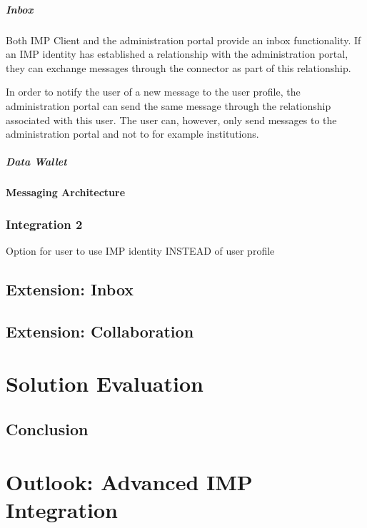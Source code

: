 \documentclass[
     12pt,         %
     a4paper,      %
     BCOR=10mm,version=first,     %
     DIV=14,version=first,        %
     ]{scrreprt}
\begin{document}
\paragraph{Inbox}

Both IMP Client and the administration portal provide an inbox functionality. If an IMP identity has established a relationship with the administration portal, they can exchange messages through the connector as part of this relationship.

In order to notify the user of a new message to the user profile, the administration portal can send the same message through the relationship associated with this user.
The user can, however, only send messages to the administration portal and not to for example institutions.

\paragraph{Data Wallet}

\subsubsection{Messaging Architecture}

\subsection{Integration 2}

Option for user to use IMP identity INSTEAD of user profile

\section{Extension: Inbox}

\section{Extension: Collaboration}

\chapter{Solution Evaluation}

\section{Conclusion}

\chapter{Outlook: Advanced IMP Integration}
\end{document}
